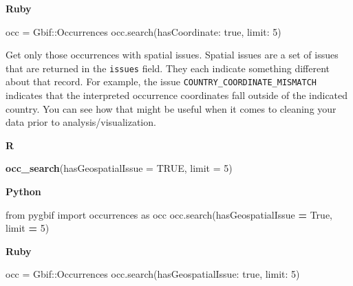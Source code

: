 \documentclass[3p]{elsarticle} %
\newenvironment{Shaded}{\begin{snugshade}}{\end{snugshade}}
\newcommand{\DataTypeTok}[1]{\textcolor[rgb]{0.13,0.29,0.53}{#1}}
\newcommand{\DecValTok}[1]{\textcolor[rgb]{0.00,0.00,0.81}{#1}}
\newcommand{\ImportTok}[1]{#1}
\newcommand{\KeywordTok}[1]{\textcolor[rgb]{0.13,0.29,0.53}{\textbf{#1}}}
\newcommand{\NormalTok}[1]{#1}
\newcommand{\OperatorTok}[1]{\textcolor[rgb]{0.81,0.36,0.00}{\textbf{#1}}}
\newcommand{\OtherTok}[1]{\textcolor[rgb]{0.56,0.35,0.01}{#1}}
\newcommand{\StringTok}[1]{\textcolor[rgb]{0.31,0.60,0.02}{#1}}
\newcommand{\VariableTok}[1]{\textcolor[rgb]{0.00,0.00,0.00}{#1}}
\begin{document}
\textbf{Ruby}

\begin{Shaded}
\begin{Highlighting}[]
\NormalTok{occ = }\DataTypeTok{Gbif}\NormalTok{::}\DataTypeTok{Occurrences}
\NormalTok{occ.search(}\StringTok{hasCoordinate: }\DecValTok{true}\NormalTok{, }\StringTok{limit: }\DecValTok{5}\NormalTok{)}
\end{Highlighting}
\end{Shaded}

Get only those occurrences with spatial issues. Spatial issues are a set
of issues that are returned in the \texttt{issues} field. They each
indicate something different about that record. For example, the issue
\texttt{COUNTRY\_COORDINATE\_MISMATCH} indicates that the interpreted
occurrence coordinates fall outside of the indicated country. You can
see how that might be useful when it comes to cleaning your data prior
to analysis/visualization.

\textbf{R}

\begin{Shaded}
\begin{Highlighting}[]
\KeywordTok{occ\_search}\NormalTok{(}\DataTypeTok{hasGeospatialIssue =} \OtherTok{TRUE}\NormalTok{, }\DataTypeTok{limit =} \DecValTok{5}\NormalTok{)}
\end{Highlighting}
\end{Shaded}

\textbf{Python}

\begin{Shaded}
\begin{Highlighting}[]
\ImportTok{from}\NormalTok{ pygbif }\ImportTok{import}\NormalTok{ occurrences }\ImportTok{as}\NormalTok{ occ}
\NormalTok{occ.search(hasGeospatialIssue }\OperatorTok{=} \VariableTok{True}\NormalTok{, limit }\OperatorTok{=} \DecValTok{5}\NormalTok{)}
\end{Highlighting}
\end{Shaded}

\textbf{Ruby}

\begin{Shaded}
\begin{Highlighting}[]
\NormalTok{occ = }\DataTypeTok{Gbif}\NormalTok{::}\DataTypeTok{Occurrences}
\NormalTok{occ.search(}\StringTok{hasGeospatialIssue: }\DecValTok{true}\NormalTok{, }\StringTok{limit: }\DecValTok{5}\NormalTok{)}
\end{Highlighting}
\end{Shaded}
\end{document}
